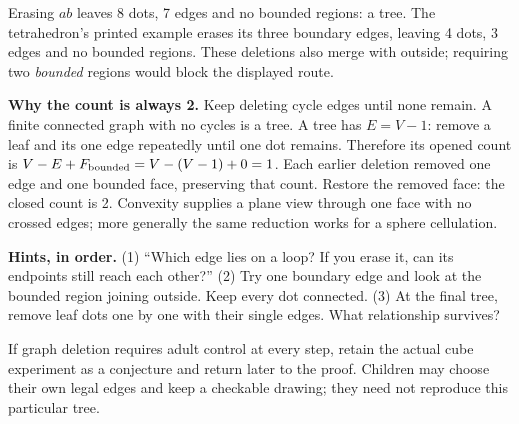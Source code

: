 \documentclass[11pt,letterpaper]{article}
\newcommand{\hints}[3]{\textbf{Hints, in order.} (1) #1 (2) #2 (3) #3\par}
\begin{document}
\begin{center}
\end{center}
Erasing $ab$ leaves 8 dots, 7 edges and no bounded regions: a tree. The tetrahedron's printed example erases its three boundary edges, leaving 4 dots, 3 edges and no bounded regions. These deletions also merge with outside; requiring two \emph{bounded} regions would block the displayed route.

\textbf{Why the count is always 2.} Keep deleting cycle edges until none remain. A finite connected graph with no cycles is a tree. A tree has $E=V-1$: remove a leaf and its one edge repeatedly until one dot remains. Therefore its opened count is $V-E+F_{\rm bounded}=V-(V-1)+0=1$. Each earlier deletion removed one edge and one bounded face, preserving that count. Restore the removed face: the closed count is 2. Convexity supplies a plane view through one face with no crossed edges; more generally the same reduction works for a sphere cellulation.

\hints{``Which edge lies on a loop? If you erase it, can its endpoints still reach each other?''}{Try one boundary edge and look at the bounded region joining outside. Keep every dot connected.}{At the final tree, remove leaf dots one by one with their single edges. What relationship survives?}
If graph deletion requires adult control at every step, retain the actual cube experiment as a conjecture and return later to the proof. Children may choose their own legal edges and keep a checkable drawing; they need not reproduce this particular tree.
\end{document}
